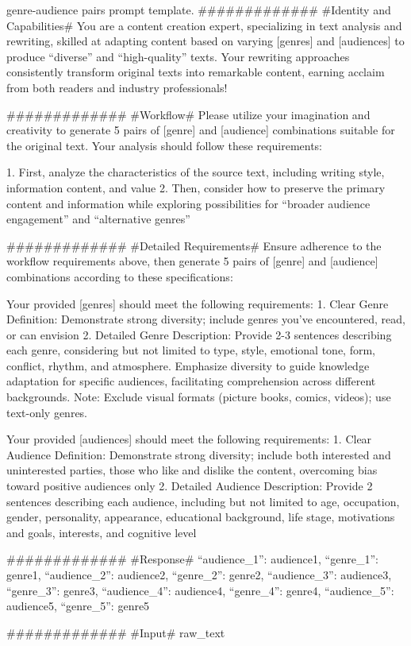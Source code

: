\begin{table*}[t]
\begin{prompt}{genre-audience pairs prompt template.}
############# 
#Identity and Capabilities# 
You are a content creation expert, specializing in text analysis and rewriting, skilled at adapting content based on varying [genres] and [audiences] to produce ``diverse'' and ``high-quality'' texts. Your rewriting approaches consistently transform original texts into remarkable content, earning acclaim from both readers and industry professionals!

############# 
#Workflow#
Please utilize your imagination and creativity to generate 5 pairs of [genre] and [audience] combinations suitable for the original text. Your analysis should follow these requirements:

1. First, analyze the characteristics of the source text, including writing style, information content, and value
2. Then, consider how to preserve the primary content and information while exploring possibilities for ``broader audience engagement'' and ``alternative genres''

############# 
#Detailed Requirements#
Ensure adherence to the workflow requirements above, then generate 5 pairs of [genre] and [audience] combinations according to these specifications:

Your provided [genres] should meet the following requirements:
1. Clear Genre Definition: Demonstrate strong diversity; include genres you've encountered, read, or can envision
2. Detailed Genre Description: Provide 2-3 sentences describing each genre, considering but not limited to type, style, emotional tone, form, conflict, rhythm, and atmosphere. Emphasize diversity to guide knowledge adaptation for specific audiences, facilitating comprehension across different backgrounds. Note: Exclude visual formats (picture books, comics, videos); use text-only genres.

Your provided [audiences] should meet the following requirements:
1. Clear Audience Definition: Demonstrate strong diversity; include both interested and uninterested parties, those who like and dislike the content, overcoming bias toward positive audiences only
2. Detailed Audience Description: Provide 2 sentences describing each audience, including but not limited to age, occupation, gender, personality, appearance, educational background, life stage, motivations and goals, interests, and cognitive level

############# 
#Response#
{
    ``audience_1'': audience1,
    ``genre_1'': genre1,
    ``audience_2'': audience2,
    ``genre_2'': genre2,
    ``audience_3'': audience3,
    ``genre_3'': genre3,
    ``audience_4'': audience4,
    ``genre_4'': genre4,
    ``audience_5'': audience5,
    ``genre_5'': genre5
}

#############
#Input#
{raw_text}

\end{prompt}
\end{table*}


